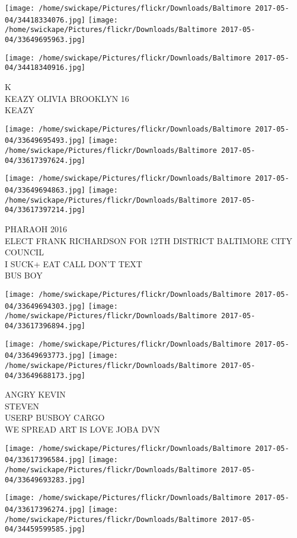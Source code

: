 \documentclass[10pt,letterpaper]{article}
\begin{document}
\texttt{[image: /home/swickape/Pictures/flickr/Downloads/Baltimore 2017-05-04/34418334076.jpg]}
\texttt{[image: /home/swickape/Pictures/flickr/Downloads/Baltimore 2017-05-04/33649695963.jpg]}

\vspace{0.25in}
\texttt{[image: /home/swickape/Pictures/flickr/Downloads/Baltimore 2017-05-04/34418340916.jpg]}

K\\
KEAZY OLIVIA BROOKLYN 16\\
KEAZY
\pagebreak

\texttt{[image: /home/swickape/Pictures/flickr/Downloads/Baltimore 2017-05-04/33649695493.jpg]}
\texttt{[image: /home/swickape/Pictures/flickr/Downloads/Baltimore 2017-05-04/33617397624.jpg]}

\texttt{[image: /home/swickape/Pictures/flickr/Downloads/Baltimore 2017-05-04/33649694863.jpg]}
\texttt{[image: /home/swickape/Pictures/flickr/Downloads/Baltimore 2017-05-04/33617397214.jpg]}

PHARAOH 2016\\
ELECT FRANK RICHARDSON FOR 12TH DISTRICT BALTIMORE CITY COUNCIL\\
I SUCK+ EAT CALL DON'T TEXT\\
BUS BOY
\pagebreak

\texttt{[image: /home/swickape/Pictures/flickr/Downloads/Baltimore 2017-05-04/33649694303.jpg]}
\texttt{[image: /home/swickape/Pictures/flickr/Downloads/Baltimore 2017-05-04/33617396894.jpg]}

\texttt{[image: /home/swickape/Pictures/flickr/Downloads/Baltimore 2017-05-04/33649693773.jpg]}
\texttt{[image: /home/swickape/Pictures/flickr/Downloads/Baltimore 2017-05-04/33649688173.jpg]}

ANGRY KEVIN\\
STEVEN\\
USERP BUSBOY CARGO\\
WE SPREAD ART IS LOVE JOBA DVN
\pagebreak

\texttt{[image: /home/swickape/Pictures/flickr/Downloads/Baltimore 2017-05-04/33617396584.jpg]}
\texttt{[image: /home/swickape/Pictures/flickr/Downloads/Baltimore 2017-05-04/33649693283.jpg]}

\texttt{[image: /home/swickape/Pictures/flickr/Downloads/Baltimore 2017-05-04/33617396274.jpg]}
\texttt{[image: /home/swickape/Pictures/flickr/Downloads/Baltimore 2017-05-04/34459599585.jpg]}
\end{document}
